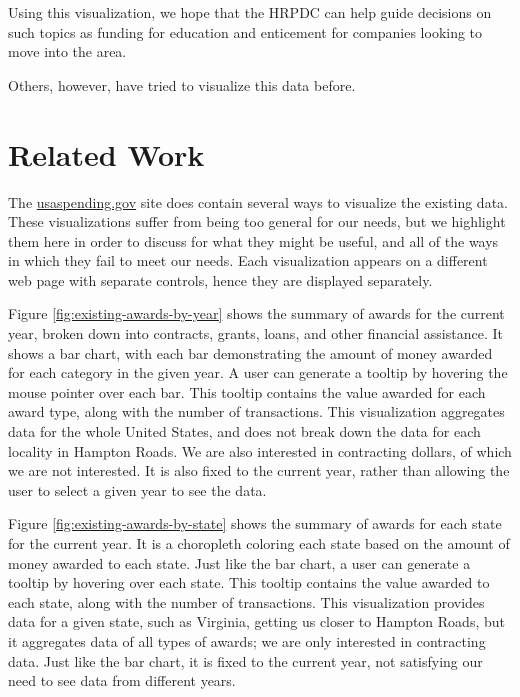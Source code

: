 \documentclass[10pt,journal,compsoc]{IEEEtran}
\begin{document}
Using this visualization, we hope that the HRPDC can help guide decisions on such topics as funding for education and enticement for companies looking to move into the area. 

Others, however, have tried to visualize this data before.

\section{Related Work}

The \url{usaspending.gov} site does contain several ways to visualize the existing data.  These visualizations suffer from being too general for our needs, but we highlight them here in order to discuss for what they might be useful, and all of the ways in which they fail to meet our needs.  Each visualization appears on a different web page with separate controls, hence they are displayed separately.

Figure \ref{fig:existing-awards-by-year} shows the summary of awards for the current year, broken down into contracts, grants, loans, and other financial assistance.  It shows a bar chart, with each bar demonstrating the amount of money awarded for each category in the given year.  A user can generate a tooltip by hovering the mouse pointer over each bar.  This tooltip contains the value awarded for each award type, along with the number of transactions.  This visualization aggregates data for the whole United States, and does not break down the data for each locality in Hampton Roads.  We are also interested in contracting dollars, of which we are not interested.  It is also fixed to the current year, rather than allowing the user to select a given year to see the data.

Figure \ref{fig:existing-awards-by-state} shows the summary of awards for each state for the current year.  It is a choropleth coloring each state based on the amount of money awarded to each state.  Just like the bar chart, a user can generate a tooltip by hovering over each state.  This tooltip contains the value awarded to each state, along with the number of transactions.  This visualization provides data for a given state, such as Virginia, getting us closer to Hampton Roads, but it aggregates data of all types of awards; we are only interested in contracting data.  Just like the bar chart, it is fixed to the current year, not satisfying our need to see data from different years.
\end{document}
